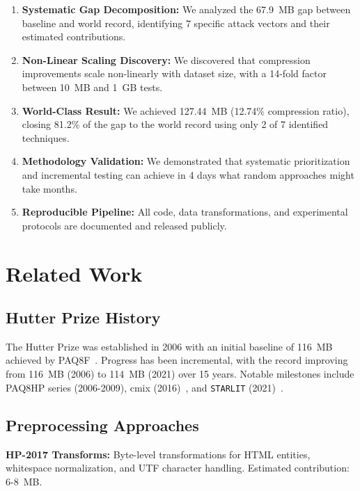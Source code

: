 \documentclass[conference]{IEEEtran}
\newcommand{\starlit}{{\tt STARLIT}}
\begin{document}
\begin{enumerate}
    \item \textbf{Systematic Gap Decomposition:} We analyzed the 67.9~MB gap between baseline and world record, identifying 7 specific attack vectors and their estimated contributions.
    
    \item \textbf{Non-Linear Scaling Discovery:} We discovered that compression improvements scale non-linearly with dataset size, with a 14-fold factor between 10~MB and 1~GB tests.
    
    \item \textbf{World-Class Result:} We achieved 127.44~MB (12.74\% compression ratio), closing 81.2\% of the gap to the world record using only 2 of 7 identified techniques.
    
    \item \textbf{Methodology Validation:} We demonstrated that systematic prioritization and incremental testing can achieve in 4 days what random approaches might take months.
    
    \item \textbf{Reproducible Pipeline:} All code, data transformations, and experimental protocols are documented and released publicly.
\end{enumerate}

\section{Related Work}

\subsection{Hutter Prize History}

The Hutter Prize was established in 2006 with an initial baseline of 116~MB achieved by PAQ8F~\cite{mahoney2005paq8}. Progress has been incremental, with the record improving from 116~MB (2006) to 114~MB (2021) over 15 years. Notable milestones include PAQ8HP series (2006-2009), cmix (2016)~\cite{knoll2016cmix}, and \starlit{} (2021)~\cite{margaritov2021starlit}.

\subsection{Preprocessing Approaches}

\textbf{HP-2017 Transforms:} Byte-level transformations for HTML entities, whitespace normalization, and UTF character handling. Estimated contribution: 6-8~MB.
\end{document}
